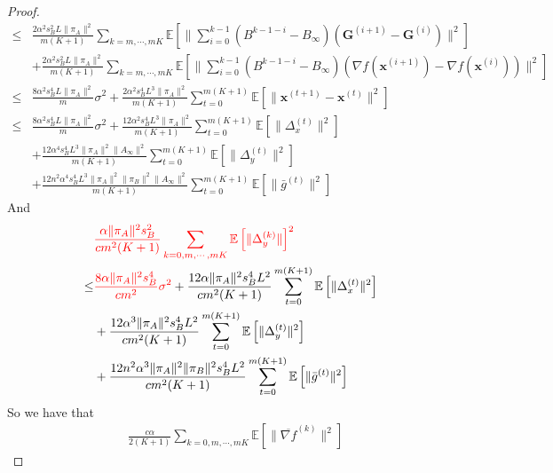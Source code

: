 \documentclass{article}
\newcommand{\vx}{{\mathbf{x}}}
\newcommand{\EE}[1]{\mathbb{E}\left[#1\right]}
\newcommand{\norm}[1]{\| #1 \|}
\begin{document}
\begin{proof}
\begin{align*}
    \leq&\frac{2\alpha^2s_B^2L\norm{\pi_A}^2}{m(K+1)}\sum_{k=m,\cdots,mK}\EE{\norm{\sum_{i=0}^{k-1}(B^{k-1-i}-B_{\infty})(\mathbf{G}^{(i+1)}-\mathbf{G}^{(i)})}^2}\\&+\frac{2\alpha^2s_B^2L\norm{\pi_A}^2}{m(K+1)}\sum_{k=m,\cdots,mK}\EE{\norm{\sum_{i=0}^{k-1}(B^{k-1-i}-B_{\infty})(\nabla f(\vx^{(i+1)})-\nabla f(\vx^{(i)}))}^2}\\
    \leq&\frac{8\alpha^2s_B^4L\norm{\pi_A}^2}{m}\sigma^2+\frac{2\alpha^2s_B^4L^3\norm{\pi_A}^2}{m(K+1)}\sum_{t=0}^{m(K+1)}\EE{\norm{\vx^{(t+1)}-\vx^{(t)}}^2}
    \\\leq&\frac{8\alpha^2s_B^4L\norm{\pi_A}^2}{m}\sigma^2+\frac{12\alpha^2s_B^4L^3\norm{\pi_A}^2}{m(K+1)}\sum_{t=0}^{m(K+1)}\EE{\norm{\Delta_x^{(t)}}^2}\\&+\frac{12\alpha^4s_B^4L^3\norm{\pi_A}^2\norm{A_{\infty}}^2}{m(K+1)}\sum_{t=0}^{m(K+1)}\EE{\norm{\Delta_y^{(t)}}^2}\\&+\frac{12n^2\alpha^4s_B^4L^3\norm{\pi_A}^2\norm{\pi_B}^2\norm{A_{\infty}}^2}{m(K+1)}\sum_{t=0}^{m(K+1)}\EE{\norm{\bar{g}^{(t)}}^2}
  \end{align*}
  And
  \begin{align*}
    &\textcolor{red}{\frac{\alpha\norm{\pi_A}^2s_B^2}{cm^2(K+1)}\sum_{k=0,m,\cdots,mK}\EE{\norm{\Delta_y^{(k)}}}^2}\\
    \leq&\textcolor{red}{\frac{8\alpha \norm{\pi_A}^2s_B^4}{cm^2}\sigma^2}+\frac{12\alpha \norm{\pi_A}^2s_B^4L^2}{cm^2(K+1)}\sum_{t=0}^{m(K+1)}\EE{\norm{\Delta_x^{(t)}}^2}\\&+\frac{12\alpha^3\norm{\pi_A}^2s_B^4L^2}{cm^2(K+1)}\sum_{t=0}^{m(K+1)}\EE{\norm{\Delta_y^{(t)}}^2}\\&+\frac{12n^2\alpha^3\norm{\pi_A}^2\norm{\pi_B}^2s_B^4L^2}{cm^2(K+1)}\sum_{t=0}^{m(K+1)}\EE{\norm{\bar{g}^{(t)}}^2}
  \end{align*}
  So we have that 
  \begin{align*}
    &\frac{c\alpha }{2(K+1)}\sum_{k=0,m,\cdots,mK}\EE{\norm{\overline{\nabla f}^{(k)}}^2}

\end{align*}
\end{proof}
\end{document}
